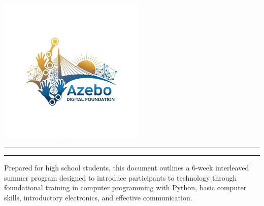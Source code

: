 
\begin{titlepage}

 \centering
    
    \includegraphics[width=7cm]{logo.jpg}
    
    
    \centering
    \vspace*{2cm} %


    {\color{primaryblue}\rule{\textwidth}{1.5pt}}\par %
    \vspace{1em}
    {\Huge\bfseries \programname \par} %
    {\huge\bfseries \docsubtitle \par} %
    \vspace{1em}
    {\color{primaryblue}\rule{\textwidth}{0.8pt}}\par %

    \vspace{2cm} %

    {\Large \teamname \par} %
    \vspace{0.5cm}
    {\large \docdate \par} %

    \vfill %

    {\color{darkgray}
    \small
  Prepared for high school students, this document outlines a 6-week interleaved summer program designed to introduce participants to technology through foundational training in computer programming with Python, basic computer skills, introductory electronics, and effective communication.
    }
\end{titlepage}

